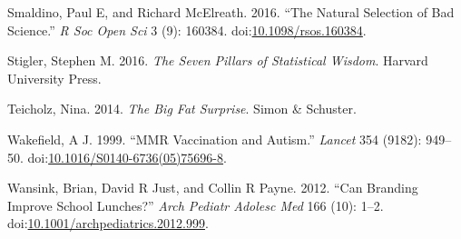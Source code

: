 \documentclass[]{book}
\theoremstyle{definition}
\theoremstyle{definition}
\theoremstyle{definition}
\theoremstyle{remark}
\begin{document}
\hypertarget{ref-smal:mcel:2016}{}
Smaldino, Paul E, and Richard McElreath. 2016. ``The Natural Selection
of Bad Science.'' \emph{R Soc Open Sci} 3 (9): 160384.
doi:\href{https://doi.org/10.1098/rsos.160384}{10.1098/rsos.160384}.

\hypertarget{ref-stig}{}
Stigler, Stephen M. 2016. \emph{The Seven Pillars of Statistical
Wisdom}. Harvard University Press.

\hypertarget{ref-teic:2014}{}
Teicholz, Nina. 2014. \emph{The Big Fat Surprise}. Simon \& Schuster.

\hypertarget{ref-wake:1999}{}
Wakefield, A J. 1999. ``MMR Vaccination and Autism.'' \emph{Lancet} 354
(9182): 949--50.
doi:\href{https://doi.org/10.1016/S0140-6736(05)75696-8}{10.1016/S0140-6736(05)75696-8}.

\hypertarget{ref-wans:just:payn:2012}{}
Wansink, Brian, David R Just, and Collin R Payne. 2012. ``Can Branding
Improve School Lunches?'' \emph{Arch Pediatr Adolesc Med} 166 (10):
1--2.
doi:\href{https://doi.org/10.1001/archpediatrics.2012.999}{10.1001/archpediatrics.2012.999}.
\end{document}
